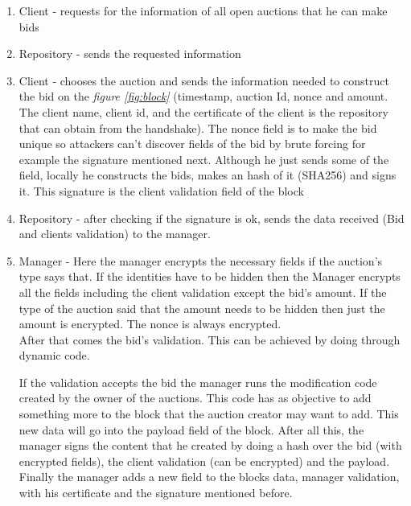 \documentclass[12pt]{article}
\begin{document}
\begin{enumerate}
    \item Client - requests for the information of all open auctions that he can make bids

    \item Repository - sends the requested information

    \item Client - chooses the auction and sends the information needed to construct the bid on the 
      \textit{figure \ref{fig:block}} (timestamp, auction Id, nonce and amount. The client name, client id, 
      and the certificate of the client is the repository that can obtain from the handshake). The nonce
      field is to make the bid unique so attackers can't discover fields of the bid by brute forcing
      for example the signature mentioned next. Although he just sends some of the field, locally he constructs the 
      bids, makes an hash of it (SHA256) and signs it. This signature is the client validation field of the block

    \item Repository - after checking if the signature is ok, sends the data received (Bid and clients validation)
      to the manager.

    \item Manager - Here the manager encrypts the necessary fields if the auction's type says that. 
    \label{itm:bidvalidation}
      If the identities have to be hidden then the Manager encrypts all the fields including the client validation except the 
      bid's amount. If the type of the auction said that the amount needs to be hidden then just the 
      amount is encrypted. The nonce is always encrypted. \\
      After that comes the bid's validation. This can be achieved by doing through dynamic code. 





      If the validation accepts the bid the manager runs the modification code created by the owner 
        of the auctions. This code has as objective to add something more to the block that the auction 
        creator may want to add. This new data will go into the payload field of the block.
      After all this, the manager signs the content that he created by doing a hash over the bid (with 
        encrypted fields), the client validation (can be encrypted) and the payload. Finally the manager 
        adds a new field to the blocks data, manager validation, with his certificate and the signature 
        mentioned before.


\end{enumerate}
\end{document}
